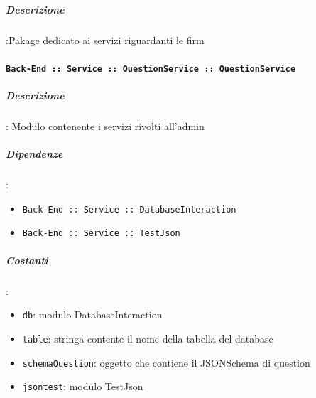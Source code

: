 \documentclass[../DefinizioneDiProdotto_v2.0.0.tex]{subfiles}
\begin{document}
\subparagraph{Descrizione}:Pakage dedicato ai servizi riguardanti le firm

\paragraph{\texttt{Back-End :: Service :: QuestionService :: QuestionService}}
\subparagraph{Descrizione}: Modulo contenente i servizi rivolti all'admin
\subparagraph{Dipendenze}:
\begin{itemize}
	\item \texttt{Back-End :: Service :: DatabaseInteraction}
	\item \texttt{Back-End :: Service :: TestJson}
\end{itemize}
\subparagraph{Costanti}:
\begin{itemize}
	\item \texttt{db}: modulo DatabaseInteraction
	\item \texttt{table}: stringa contente il nome della tabella del database
	\item \texttt{schemaQuestion}: oggetto che contiene il JSONSchema di question
	\item \texttt{jsontest}: modulo TestJson
\end{itemize}
\end{document}
